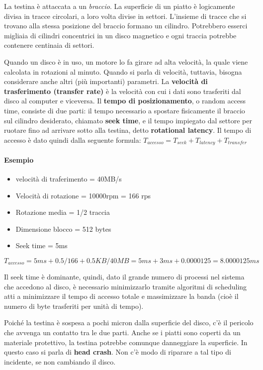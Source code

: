 \documentclass[a4paper]{article}
\begin{document}
La testina è attaccata a un \textit{braccio}. La superficie di un piatto è logicamente divisa in tracce circolari, a loro volta divise in settori. L'insieme di tracce che si trovano alla stessa posizione del braccio formano un cilindro. Potrebbero esserci migliaia di cilindri concentrici in un disco magnetico e ogni traccia potrebbe contenere centinaia di settori.

Quando un disco è in uso, un motore lo fa girare ad alta velocità, la quale viene calcolata in rotazioni al minuto. Quando si parla di velocità, tuttavia, bisogna considerare anche altri (più importanti) parametri. La \textbf{velocità di trasferimento (transfer rate)} è la velocità con cui i dati sono trasferiti dal disco al computer e viceversa. Il \textbf{tempo di posizionamento}, o random access time, consiste di due parti: il tempo necessario a spostare fisicamente il braccio sul cilindro desiderato, chiamato \textbf{seek time}, e il tempo impiegato dal settore per ruotare fino ad arrivare sotto alla testina, detto \textbf{rotational latency}.\newline
Il tempo di accesso è dato quindi dalla seguente formula: \newline
$ T_{accesso} = T_{seek} + T_{latency} + T_{transfer} $

\paragraph{Esempio}
\begin{itemize}
    \item velocità di traferimento = 40MB/s
    \item Velocità di rotazione = 10000rpm = 166 rps
    \item Rotazione media = 1/2 traccia
    \item Dimensione blocco = 512 bytes
    \item Seek time = 5ms
\end{itemize}

$$ T_{accesso} = 5 ms + 0.5/166 + 0.5 KB/40 MB = 5 ms + 3 ms + 0.0000125 = 8.0000125 ms $$

Il seek time è dominante, quindi, dato il grande numero di processi nel sistema che accedono al disco, è necessario minimizzarlo tramite algoritmi di scheduling atti a minimizzare il tempo di accesso totale e massimizzare la banda (cioè il numero di byte trasferiti per unità di tempo).

Poiché la testina è sospesa a pochi micron dalla superficie del disco, c'è il pericolo che avvenga un contatto tra le due parti. Anche se i piatti sono coperti da un materiale protettivo, la testina potrebbe comunque danneggiare la superficie. In questo caso si parla di \textbf{head crash}. Non c'è modo di riparare a tal tipo di incidente, se non cambiando il disco.
\end{document}
